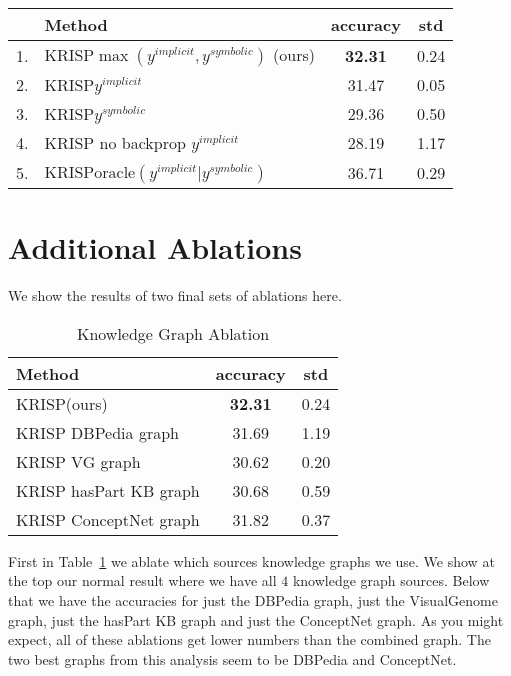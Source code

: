 \documentclass[final]{cvpr}
\providecommand{\ModelName}{KRISP\xspace}
\begin{document}
\begin{table*}[h]
\begin{center}
\begin{tabular}{@{}rlcc@{}}
\toprule
&Method &  accuracy &  std\\ 
\hline
1. & \ModelName $\max(y^{implicit},y^{symbolic})$ (ours) & \bf{32.31} & 0.24 \\
2. & \ModelName $y^{implicit}$ & 31.47 & 0.05 \\
3. & \ModelName $y^{symbolic}$ & 29.36 & 0.50 \\
4. & \ModelName no backprop $y^{implicit}$ & 28.19 & 1.17 \\
\hline
5. & \ModelName $\text{oracle}(y^{implicit}|y^{symbolic})$  & 36.71 & 0.29\\
\bottomrule
\end{tabular}
\end{center}
\caption{\ModelName Subpart Analysis on OK-VQA v1.1, with sample standard deviations. Mirrors Table~\ref{table:GraphAnalysis} in the main text.}
\label{table:GraphAnalysisstd}
\end{table*}


\section{Additional Ablations}
\label{appx:ablations}
We show the results of two final sets of ablations here.

\begin{table}[h]
\begin{center}
\begin{tabular}{@{}lcc@{}}
\toprule
Method & accuracy & std\\ \midrule
\ModelName (ours) & \bf{32.31} & 0.24 \\
\ModelName DBPedia graph & 31.69 & 1.19\\
\ModelName VG graph & 30.62 & 0.20 \\
\ModelName hasPart KB graph & 30.68 & 0.59\\
\ModelName ConceptNet graph & 31.82 & 0.37\\
\bottomrule
\end{tabular}
\end{center}
\caption{Knowledge Graph Ablation}
\label{table:graphablation}
\end{table}


First in Table~\ref{table:graphablation} we ablate which sources knowledge graphs we use. We show at the top our normal result where we have all $4$ knowledge graph sources. Below that we have the accuracies for just the DBPedia graph, just the VisualGenome graph, just the hasPart KB graph and just the ConceptNet graph. As you might expect, all of these ablations get lower numbers than the combined graph. The two best graphs from this analysis seem to be DBPedia and ConceptNet.
\end{document}
